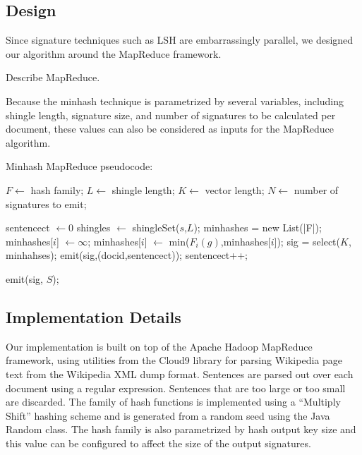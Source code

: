 \documentclass{acm_proc_article-sp}
\begin{document}
\subsection{Design}
Since signature techniques such as LSH are embarrassingly parallel, we designed our algorithm around the MapReduce framework.

Describe MapReduce.

Because the minhash technique is parametrized by several variables, including shingle length, signature size, and number of signatures to be calculated per document, these values can also be considered as inputs for the MapReduce algorithm.

\begin{table}
Minhash MapReduce pseudocode:
\begin{algorithmic}
 \State $F \gets $ hash family;
 \State $L \gets $ shingle length;
 \State $K \gets $ vector length;
 \State $N \gets $ number of signatures to emit;
\EndFunction

 \State sentencect $\gets 0$
  \State shingles $\gets$ shingleSet($s$,$L$);
  \State minhashes = new List(|F|);
    \State minhashes[$i$] $\gets \infty$;
   \EndFor
     \State minhashes[$i$] $\gets$ min($F_i(g)$,minhashes[$i$]);
    \EndFor
   \EndFor
   \State sig = select($K$, minhahses);
   \State emit(sig,(docid,sentencect));
  \EndFor
  \State  sentencect++;
 \EndWhile
\EndFunction
\end{algorithmic}

\begin{algorithmic}
\State    emit(sig, $S$);
\EndIf
\EndFunction
\end{algorithmic}
\end{table}

\subsection{Implementation Details}

Our implementation is built on top of the Apache Hadoop MapReduce framework, using utilities from the Cloud9 library for parsing Wikipedia page text from the Wikipedia XML dump format. Sentences are parsed out over each document using a regular expression. Sentences that are too large or too small are discarded. The family of hash functions is implemented using a ``Multiply Shift''  \cite{} hashing scheme and is generated from a random seed using the Java Random class. The hash family is also parametrized by hash output key size and this value can be configured to affect the size of the output signatures.
\end{document}
